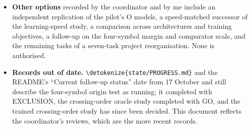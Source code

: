 \documentclass[11pt,a4paper]{article}
\DeclareRobustCommand{\_}{\ifmmode\origunderscore\else\textunderscore\allowbreak\fi}
\DeclareRobustCommand{\fpath}[1]{\begingroup\small\expandafter\nolinkurl\expandafter{\detokenize{#1}}\endgroup}
\begin{document}
\begin{itemize}
models.
\item \textbf{Other options} recorded by the coordinator and by me include an independent
replication of the pilot's O models, a speed-matched successor of the learning-speed study, a
comparison across architectures and training objectives, a follow-up on the four-symbol margin and
comparator scale, and the remaining tasks of a seven-task project reorganisation. None is
authorised.
\item \textbf{Records out of date.} \fpath{state/PROGRESS.md} and the README's ``Current follow-up status''
date from 17 October and still describe the four-symbol origin test as running; it completed
with EXCLUSION, the crossing-order oracle study completed with GO, and the trained crossing-order
study has since been decided. This document reflects the coordinator's reviews, which are the
more recent records.
\end{itemize}

\end{document}
